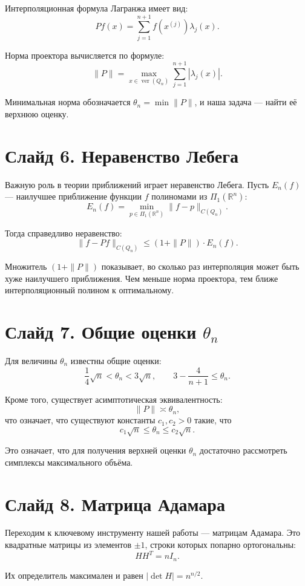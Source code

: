 \documentclass[a4paper,12pt]{article}
\begin{document}
Интерполяционная формула Лагранжа имеет вид:
\[
P f(x) = \sum_{j=1}^{n+1} f(x^{(j)}) \lambda_j(x).
\]

Норма проектора вычисляется по формуле:
\[
\|P\| = \max_{x \in \operatorname{ver}(Q_n)} \sum_{j=1}^{n+1} |\lambda_j(x)|.
\]

Минимальная норма обозначается $\theta_n = \min \|P\|$, и наша задача — найти её верхнюю оценку.

\section*{Слайд 6. Неравенство Лебега}

Важную роль в теории приближений играет неравенство Лебега. Пусть $E_n(f)$ — наилучшее приближение функции $f$ полиномами из $\Pi_1(\mathbb{R}^n)$:
\[
E_n(f) = \min_{p \in \Pi_1(\mathbb{R}^n)} \|f - p\|_{C(Q_n)}.
\]

Тогда справедливо неравенство:
\[
\|f - P f\|_{C(Q_n)} \le (1 + \|P\|) \cdot E_n(f).
\]

Множитель $(1 + \|P\|)$ показывает, во сколько раз интерполяция может быть хуже наилучшего приближения. Чем меньше норма проектора, тем ближе интерполяционный полином к оптимальному.

\section*{Слайд 7. Общие оценки $\theta_n$}

Для величины $\theta_n$ известны общие оценки:
\[
\frac{1}{4}\sqrt{n} < \theta_n < 3\sqrt{n}, \qquad 3 - \frac{4}{n+1} \le \theta_n.
\]

Кроме того, существует асимптотическая эквивалентность:
\[
\|P\| \asymp \theta_n,
\]
что означает, что существуют константы $c_1, c_2 > 0$ такие, что
\[
c_1\sqrt{n} \le \theta_n \le c_2\sqrt{n}.
\]

Это означает, что для получения верхней оценки $\theta_n$ достаточно рассмотреть симплексы максимального объёма.

\section*{Слайд 8. Матрица Адамара}

Переходим к ключевому инструменту нашей работы — матрицам Адамара. Это квадратные матрицы из элементов $\pm 1$, строки которых попарно ортогональны:
\[
H H^T = n I_n.
\]

Их определитель максимален и равен $|\det H| = n^{n/2}$.
\end{document}
